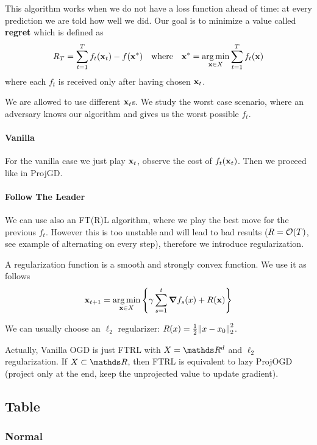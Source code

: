 \documentclass[12pt]{extarticle}
\renewcommand{\vec}[1]{\bvec{#1}}
\numberwithin{equation}{subsection}
\begin{document}
This algorithm works when we do not have a loss function ahead of time: at every prediction we are
told how well we did. Our goal is to minimize a value called \textbf{regret} which is defined as
\begin{equation}
	R_T = \sum_{t = 1}^{T}  f_t(\vec x_t) - f(\vec x^*) \quad \text{where} \quad
	\vec x^* = \argmin_{\vec x \in X} \sum_{t = 1}^{T} f_t(\vec x)
\end{equation}
where each $f_t$ is received only after having chosen $\vec x_t$.

We are allowed to use different $\vec x_t$s. We study the worst case scenario, where an adversary knows
our algorithm and gives us the worst possible $f_t$.

\paragraph{Vanilla}
For the vanilla case we just play $\vec x_t$, observe the cost of $f_t(\vec x_t)$. Then we proceed
like in ProjGD.


\paragraph{Follow The Leader}
We can use also an FT(R)L algorithm, where we play the best move for the previous $f_t$.
However this is too unstable and will lead to bad results ($R = \mathcal{O}(T)$, see example of alternating
on every step), therefore we introduce regularization.

A regularization function is a smooth and strongly convex function. We use it as follows
\begin{equation}
	\vec x_{t+1} = \argmin_{\vec x \in X} \left\{ \gamma \sum_{s=1}^{t} \grad f_s(x) + R(\vec x) \right\}
\end{equation}

We can usually choose an $\ell_2$ regularizer: $R(x) = \frac{1}{2} \norm{x - x_0}^2_2$.

Actually, Vanilla OGD is just FTRL with $X = \R^d$ and $\ell_2$ regularization.
If $X \subset \R$, then FTRL is equivalent to lazy ProjOGD (project only at the end, keep the
unprojected value to update gradient).

\subsection{Table}

\subsubsection{Normal}
\end{document}
